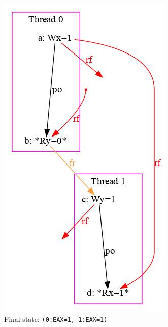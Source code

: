 \begin{figure}[!htb]
\begin{subfigure}[t]{.23\textwidth}
  \includegraphics[width=.9\linewidth]{img/my/sb-example/SB-dot-3.png}
  \caption{Final state: \texttt{(0:EAX=1,~1:EAX=1)}}
  \label{simple_wmm_x86_pic:sub3}
\end{subfigure}
\hfill
\begin{subfigure}[t]{.23\textwidth}
  \centering

\end{subfigure}
\end{figure}
